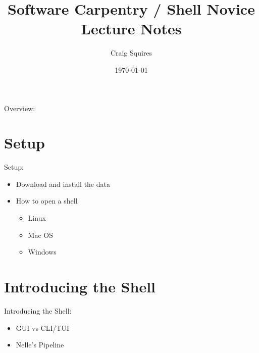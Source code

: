 \documentclass[
 size=12pt,
 paper=screen,
 mode=present,
 display=slidesnotes,
 style=paintings,
 nohandoutpagebreaks,
]{powerdot}
\title{Software Carpentry / Shell Novice \\ Lecture Notes}
\author{Craig Squires}
\date{\today}
\begin{document}
\maketitle

\begin{slide}{Overview:}
  \tableofcontents[content=sections]
\end{slide}

\section[slide=false]{Setup}

\begin{slide}{Setup:}
  \begin{itemize}
     \item Download and install the data
     \item How to open a shell
       \begin{itemize}
          \item Linux
          \item Mac OS
          \item Windows
       \end{itemize}
  \end{itemize}
\end{slide}

\section[slide=false]{Introducing the Shell}

\begin{slide}{Introducing the Shell:}
  \begin{itemize}
     \item GUI vs CLI/TUI
     \item Nelle's Pipeline
  \end{itemize}
\end{slide}
\end{document}
